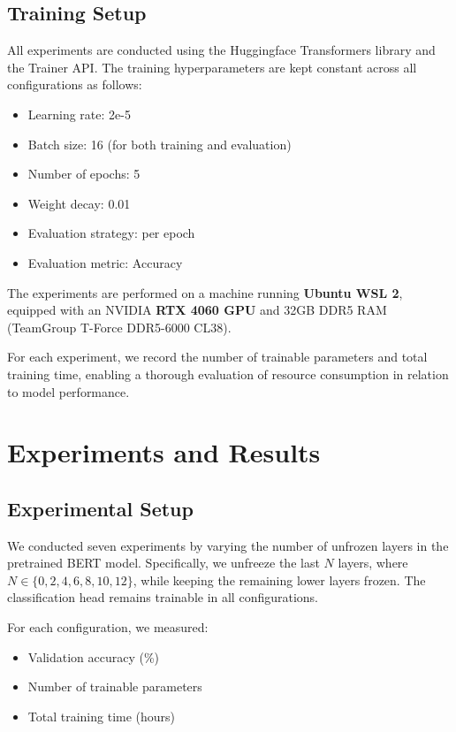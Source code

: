 \documentclass{article}
\begin{document}
\subsection{Training Setup}

All experiments are conducted using the Huggingface Transformers library and the Trainer API. The training hyperparameters are kept constant across all configurations as follows:
\begin{itemize}
    \item Learning rate: 2e-5
    \item Batch size: 16 (for both training and evaluation)
    \item Number of epochs: 5
    \item Weight decay: 0.01
    \item Evaluation strategy: per epoch
    \item Evaluation metric: Accuracy
\end{itemize}

The experiments are performed on a machine running \textbf{Ubuntu WSL 2}, equipped with an NVIDIA \textbf{RTX 4060 GPU} and 32GB DDR5 RAM (TeamGroup T-Force DDR5-6000 CL38). 

For each experiment, we record the number of trainable parameters and total training time, enabling a thorough evaluation of resource consumption in relation to model performance.



\section{Experiments and Results}

\subsection{Experimental Setup}

We conducted seven experiments by varying the number of unfrozen layers in the pretrained BERT model. Specifically, we unfreeze the last $N$ layers, where $N \in \{0, 2, 4, 6, 8, 10, 12\}$, while keeping the remaining lower layers frozen. The classification head remains trainable in all configurations.

For each configuration, we measured:
\begin{itemize}
    \item Validation accuracy (\%)
    \item Number of trainable parameters
    \item Total training time (hours)
\end{itemize}
\end{document}
